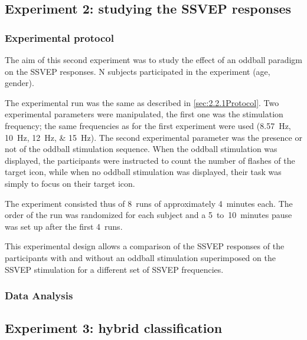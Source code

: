 \documentclass[10pt]{article}
\begin{document}
    \subsection{Experiment 2: studying the \acs{SSVEP} responses}
    \label{sec:2.3SSVEP}

        \subsubsection{Experimental protocol}
        \label{sec:2.3.1Protocol}

        The aim of this second experiment was to study the effect of an oddball paradigm on the \ac{SSVEP} responses.
        N subjects participated in the experiment (age, gender).

        The experimental run was the same as described in \autoref{sec:2.2.1Protocol}.
        Two experimental parameters were manipulated, the first one was the stimulation frequency; the same frequencies as for the first experiment were used (\SIlist[list-units = single]{8.57;10;12;15}{\Hz}).
        The second experimental parameter was the presence or not of the oddball stimulation sequence.
        When the oddball stimulation was displayed, the participants were instructed to count the number of flashes of the target icon, while when no oddball stimulation was displayed, their task was simply to focus on their target icon.

        The experiment consisted thus of 8~runs of approximately 4~minutes each.
        The order of the run was randomized for each subject and a 5~to~10~minutes pause was set up after the first 4~runs.

        This experimental design allows a comparison of the \ac{SSVEP} responses of the participants with and without an oddball stimulation superimposed on the \ac{SSVEP} stimulation for a different set of \ac{SSVEP} frequencies.


        \subsubsection{Data Analysis}
        \label{sec:2.3.2Analysis}





    \subsection{Experiment 3: hybrid classification}
    \label{sec:2.4Hybrid}
\end{document}
